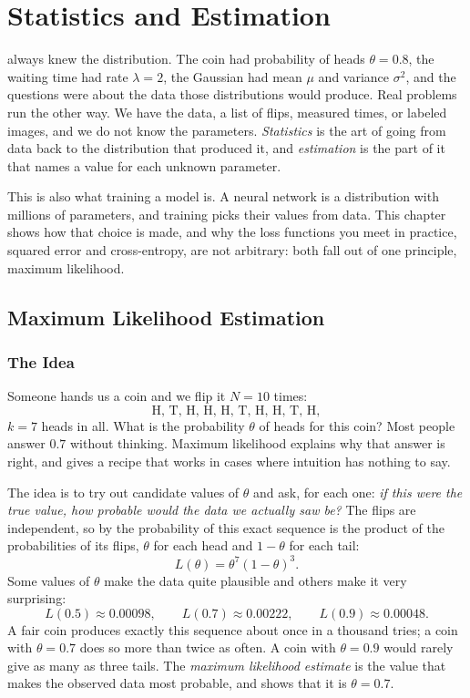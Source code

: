 \chapter{Statistics and Estimation}
\label{chap:ch06}


 always knew the distribution. The coin had probability
of heads $\theta = 0.8$, the waiting time had rate $\lambda = 2$, the
Gaussian had mean $\mu$ and variance $\sigma^2$, and the questions were
about the data those distributions would produce. Real problems run the
other way. We have the data, a list of flips, measured times, or
labeled images, and we do not know the parameters. \emph{Statistics} is
the art of going from data back to the distribution that produced it,
and \emph{estimation} is the part of it that names a value for each
unknown parameter.

This is also what training a model is. A neural network is a
distribution with millions of parameters, and training picks their
values from data. This chapter shows how that choice is made, and why
the loss functions you meet in practice, squared error and
cross-entropy, are not arbitrary: both fall out of one principle,
maximum likelihood.

\section{Maximum Likelihood Estimation}
\label{sec:ch06-mle}

\subsection{The Idea}
\label{sec:ch06-mle-idea}

Someone hands us a coin and we flip it $N = 10$ times:
\[
  \text{H, T, H, H, H, T, H, H, T, H} ,
\]
$k = 7$ heads in all. What is the probability $\theta$ of heads for
this coin? Most people answer $0.7$ without thinking. Maximum
likelihood explains why that answer is right, and gives a recipe that
works in cases where intuition has nothing to say.

The idea is to try out candidate values of $\theta$ and ask, for each
one: \emph{if this were the true value, how probable would the data we
actually saw be?} The flips are independent, so by
 the probability of this exact sequence is
the product of the probabilities of its flips, $\theta$ for each head and
$1 - \theta$ for each tail:
\[
  L(\theta) = \theta^7 (1 - \theta)^3 .
\]
Some values of $\theta$ make the data quite plausible and others make it
very surprising:
\[
  L(0.5) \approx 0.00098, \qquad
  L(0.7) \approx 0.00222, \qquad
  L(0.9) \approx 0.00048 .
\]
A fair coin produces exactly this sequence about once in a thousand
tries; a coin with $\theta = 0.7$ does so more than twice as often. A
coin with $\theta = 0.9$ would rarely give as many as three tails. The
\emph{maximum likelihood estimate} is the value that makes the observed
data most probable, and  shows that it is
$\theta = 0.7$.

